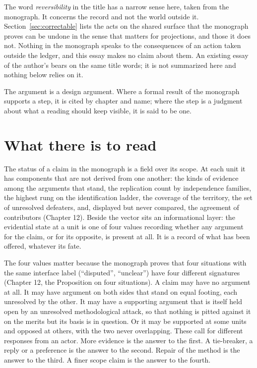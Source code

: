 \documentclass[11pt]{article}
\begin{document}
The word \emph{reversibility} in the title has a narrow sense here, taken from the monograph. It concerns the record and not the world outside it. Section~\ref{sec:correctable} lists the acts on the shared surface that the monograph proves can be undone in the sense that matters for projections, and those it does not. Nothing in the monograph speaks to the consequences of an action taken outside the ledger, and this essay makes no claim about them. An existing essay of the author's bears on the same title words; it is not summarized here and nothing below relies on it.

The argument is a design argument. Where a formal result of the monograph supports a step, it is cited by chapter and name; where the step is a judgment about what a reading should keep visible, it is said to be one.


\section{What there is to read}\label{sec:read}

The status of a claim in the monograph is a field over its scope. At each unit it has components that are not derived from one another: the kinds of evidence among the arguments that stand, the replication count by independence families, the highest rung on the identification ladder, the coverage of the territory, the set of unresolved defeaters, and, displayed but never compared, the agreement of contributors (Chapter 12). Beside the vector sits an informational layer: the evidential state at a unit is one of four values recording whether any argument for the claim, or for its opposite, is present at all. It is a record of what has been offered, whatever its fate.

The four values matter because the monograph proves that four situations with the same interface label (``disputed'', ``unclear'') have four different signatures (Chapter 12, the Proposition on four situations). A claim may have no argument at all. It may have argument on both sides that stand on equal footing, each unresolved by the other. It may have a supporting argument that is itself held open by an unresolved methodological attack, so that nothing is pitted against it on the merits but its basis is in question. Or it may be supported at some units and opposed at others, with the two never overlapping. These call for different responses from an actor. More evidence is the answer to the first. A tie-breaker, a reply or a preference is the answer to the second. Repair of the method is the answer to the third. A finer scope claim is the answer to the fourth.
\end{document}
